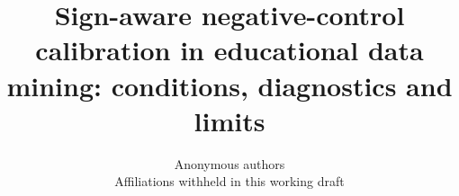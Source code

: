 \documentclass[notitlepage,12pt]{jedm}
\title{Sign-aware negative-control calibration in educational data mining: conditions, diagnostics and limits}
\date{}
\author{{\large Anonymous authors}\\Affiliations withheld in this working draft}
\begin{document}
\maketitle
\begin{abstract}

\end{abstract}


\end{document}
